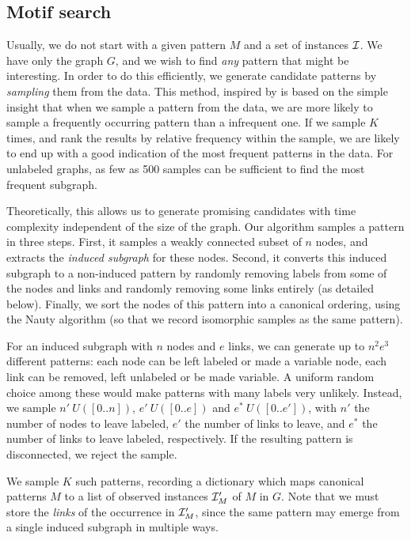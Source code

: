 \documentclass[11pt]{article}
\newcommand{\I}{{\cal I}}
\begin{document}
\subsection{Motif search}

\label{section:search}

Usually, we do not start with a given pattern $M$ and a set of instances $\I$. We have only the graph $G$, and we wish to find \emph{any} pattern that might be interesting. In order to do this efficiently, we generate candidate patterns by \emph{sampling} them from the data. This method, inspired by \cite{kashtan2004efficient} is based on the simple insight that when we sample a pattern from the data, we are more likely to sample a frequently occurring pattern than a infrequent one. If we sample $K$ times, and rank the results by relative frequency within the sample, we are likely to end up with a good indication of the most frequent patterns in the data. For unlabeled graphs, as few as 500 samples can be sufficient to find the most frequent subgraph.

Theoretically, this allows us to generate promising candidates with time complexity independent of the size of the graph. Our algorithm samples a pattern in three steps. First, it samples a weakly connected subset of $n$ nodes, and extracts the \emph{induced subgraph} for these nodes. Second, it converts this induced subgraph to a non-induced pattern by randomly removing labels from some of the nodes and links and randomly removing some links entirely (as detailed below). Finally, we sort the nodes of this pattern into a canonical ordering, using the Nauty algorithm \cite{mckay1981practical} (so that we record isomorphic samples as the same pattern).

For an induced subgraph with $n$ nodes and $e$ links, we can generate up to $n^2e^3$ different patterns: each node can be left labeled or made a variable node, each link can be removed, left unlabeled or be made variable. A uniform random choice among these would make patterns with many labels very unlikely. Instead, we sample $n' ~ U([0.. n])$, $e' ~ U([0.. e])$ and $e^*~ U([0..e'])$, with $n'$ the number of nodes to leave labeled, $e'$ the number of links to leave, and $e^*$ the number of links to leave labeled, respectively. If the resulting pattern is disconnected, we reject the sample.

We sample $K$ such patterns, recording a dictionary which maps canonical patterns $M$ to a list of observed instances $\I'_M$ of $M$ in $G$. Note that we must store the \emph{links} of the occurrence in $\I'_M$, since the same pattern may emerge from a single induced subgraph in multiple ways.
\end{document}
